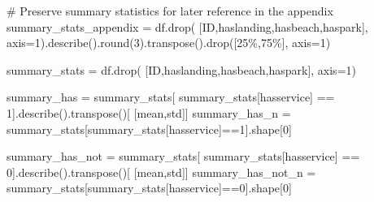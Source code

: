 \documentclass[
]{article}
\newenvironment{Shaded}{\begin{snugshade}}{\end{snugshade}}
\newcommand{\BuiltInTok}[1]{\textcolor[rgb]{0.00,0.23,0.31}{#1}}
\newcommand{\CommentTok}[1]{\textcolor[rgb]{0.37,0.37,0.37}{#1}}
\newcommand{\DecValTok}[1]{\textcolor[rgb]{0.68,0.00,0.00}{#1}}
\newcommand{\NormalTok}[1]{\textcolor[rgb]{0.00,0.23,0.31}{#1}}
\newcommand{\OperatorTok}[1]{\textcolor[rgb]{0.37,0.37,0.37}{#1}}
\newcommand{\StringTok}[1]{\textcolor[rgb]{0.13,0.47,0.30}{#1}}
\begin{document}
\begin{Shaded}
\begin{Highlighting}[]
\CommentTok{\# Preserve summary statistics for later reference in the appendix}
\NormalTok{summary\_stats\_appendix }\OperatorTok{=}\NormalTok{ df.drop(}
\NormalTok{    [}\StringTok{\textquotesingle{}ID\textquotesingle{}}\NormalTok{,}\StringTok{\textquotesingle{}haslanding\textquotesingle{}}\NormalTok{,}\StringTok{\textquotesingle{}hasbeach\textquotesingle{}}\NormalTok{,}\StringTok{\textquotesingle{}haspark\textquotesingle{}}\NormalTok{], }
\NormalTok{    axis}\OperatorTok{=}\DecValTok{1}\NormalTok{).describe().}\BuiltInTok{round}\NormalTok{(}\DecValTok{3}\NormalTok{).transpose().drop([}\StringTok{\textquotesingle{}25\%\textquotesingle{}}\NormalTok{,}\StringTok{\textquotesingle{}75\%\textquotesingle{}}\NormalTok{], axis}\OperatorTok{=}\DecValTok{1}\NormalTok{)}

\NormalTok{summary\_stats }\OperatorTok{=}\NormalTok{ df.drop(}
\NormalTok{    [}\StringTok{\textquotesingle{}ID\textquotesingle{}}\NormalTok{,}\StringTok{\textquotesingle{}haslanding\textquotesingle{}}\NormalTok{,}\StringTok{\textquotesingle{}hasbeach\textquotesingle{}}\NormalTok{,}\StringTok{\textquotesingle{}haspark\textquotesingle{}}\NormalTok{], axis}\OperatorTok{=}\DecValTok{1}\NormalTok{)}

\NormalTok{summary\_has }\OperatorTok{=}\NormalTok{ summary\_stats[}
\NormalTok{    summary\_stats[}\StringTok{\textquotesingle{}hasservice\textquotesingle{}}\NormalTok{] }\OperatorTok{==} \DecValTok{1}\NormalTok{].describe().transpose()[}
\NormalTok{        [}\StringTok{\textquotesingle{}mean\textquotesingle{}}\NormalTok{,}\StringTok{\textquotesingle{}std\textquotesingle{}}\NormalTok{]]}
\NormalTok{summary\_has\_n }\OperatorTok{=}\NormalTok{ summary\_stats[summary\_stats[}\StringTok{\textquotesingle{}hasservice\textquotesingle{}}\NormalTok{]}\OperatorTok{==}\DecValTok{1}\NormalTok{].shape[}\DecValTok{0}\NormalTok{]}

\NormalTok{summary\_has\_not }\OperatorTok{=}\NormalTok{ summary\_stats[}
\NormalTok{    summary\_stats[}\StringTok{\textquotesingle{}hasservice\textquotesingle{}}\NormalTok{] }\OperatorTok{==} \DecValTok{0}\NormalTok{].describe().transpose()[}
\NormalTok{        [}\StringTok{\textquotesingle{}mean\textquotesingle{}}\NormalTok{,}\StringTok{\textquotesingle{}std\textquotesingle{}}\NormalTok{]]}
\NormalTok{summary\_has\_not\_n }\OperatorTok{=}\NormalTok{ summary\_stats[summary\_stats[}\StringTok{\textquotesingle{}hasservice\textquotesingle{}}\NormalTok{]}\OperatorTok{==}\DecValTok{0}\NormalTok{].shape[}\DecValTok{0}\NormalTok{]}


\end{Highlighting}
\end{Shaded}
\end{document}
